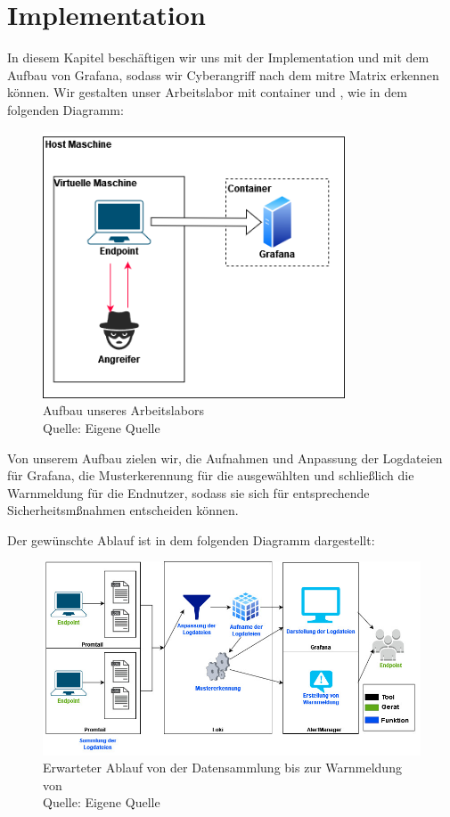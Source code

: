 \section{Implementation}
In diesem Kapitel beschäftigen wir uns mit der Implementation und mit dem Aufbau von Grafana, sodass wir \gls{Cyberangriff} nach dem \gls{mitre} Matrix erkennen können. Wir gestalten unser Arbeitslabor mit \gls{container} und , wie in dem folgenden Diagramm:

\begin{figure}[H]
   \centering
   \includegraphics[width=0.8\textwidth]{assets/Arbeitslabor.drawio.png}
   \caption{Aufbau unseres Arbeitslabors \\Quelle: Eigene Quelle}
   \centering
\end{figure}

Von unserem Aufbau zielen wir, die Aufnahmen und Anpassung der Logdateien für Grafana, die Musterkerennung für die ausgewählten  und schließlich die Warnmeldung für die Endnutzer, sodass sie sich für entsprechende Sicherheitsmßnahmen entscheiden können. 

\newpage
Der gewünschte Ablauf ist in dem folgenden Diagramm dargestellt:

\begin{figure}[H]
   \centering
   \includegraphics[width=1\textwidth]{assets/Ablauf_grafana2.jpg}
   \caption{Erwarteter Ablauf von der Datensammlung bis zur Warnmeldung von  \\Quelle: Eigene Quelle}
   \centering
\end{figure}

